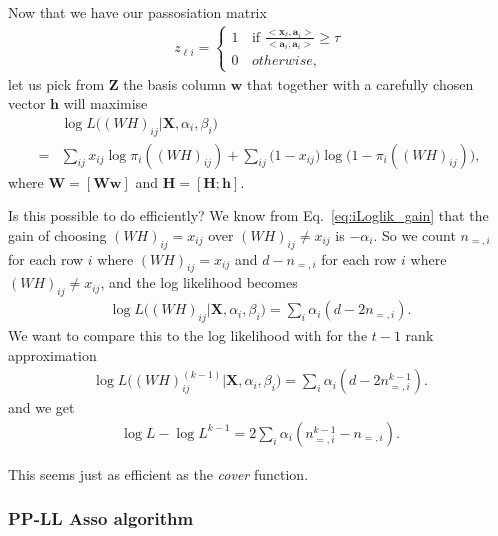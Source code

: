 \documentclass[12pt]{article}
\begin{document}
Now that we have our passosiation matrix
\begin{align} \label{eq:PAssociation}
  z_{\ell i} =
   \begin{cases}
      1 & \text{if }  \frac{<\mathbf{x}_{\ell}, \mathbf{a}_i>}{<\mathbf{a}_{i},\mathbf{a}_{i}>} \geq \tau \\
      0 \, &otherwise,
    \end{cases}
\end{align}
let us pick from $\mathbf{Z}$ the basis column $\mathbf{w}$ that together with a carefully chosen vector $\mathbf{h}$ will maximise
\begin{align}
 & \log L \big ((WH)_{ij}|\mathbf{X}, \alpha_{i}, \beta_{i} \big ) \\
 =& \sum_{i j}x_{ij} \log  \pi_i((WH)_{ij})+ \sum_{i j} \big (1 - x_{ij} \big)\log  \big ( 1 - \pi_i((WH)_{ij}) \big), \nonumber
\end{align}
where $\mathbf{W} = [\mathbf{W} \mathbf{w}]$ and  $\mathbf{H} = [\mathbf{H}; \mathbf{h}]$.

Is this possible to do efficiently?
We know from Eq.~\ref{eq:iLoglik_gain} that the gain of choosing $(WH)_{ij} = x_{ij}$ over $(WH)_{ij} \neq x_{ij}$ is $-\alpha_i$.
So we count $n_{=,i}$  for each row $i$ where $(WH)_{ij} = x_{ij}$ and $d- n_{=,i} $ for each row $i$ where  $(WH)_{ij} \neq x_{ij}$, and the log likelihood becomes
\begin{align}
 \log L \big ((WH)_{ij}|\mathbf{X}, \alpha_{i}, \beta_{i} \big ) =\sum_{i} \alpha_i (d - 2 n_{=,i}).
\end{align}
We want to compare this to the log likelihood with for the $t-1$ rank approximation
\begin{align}
 \log L \big ((WH)^{(k-1)}_{ij}|\mathbf{X}, \alpha_{i}, \beta_{i} \big ) =\sum_{i} \alpha_i (d - 2 n^{k-1}_{=,i}).
\end{align}
and we get
\begin{align}
 \log L - \log L^{k-1} = 2 \sum_{i} \alpha_i ( n^{k-1}_{=,i} - n_{=,i}).
\end{align}

This seems just as efficient as the {\it cover} function.

\subsubsection*{PP-LL Asso algorithm} %
\end{document}
